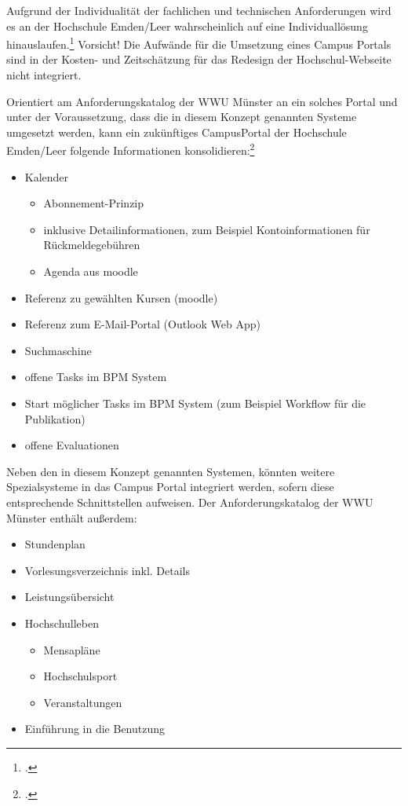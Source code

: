 Aufgrund der Individualität der fachlichen und technischen Anforderungen wird es an der Hochschule Emden/Leer wahrscheinlich auf eine Individuallösung hinauslaufen.\footcite[Vgl.][21]{dini_webportale_2007} Vorsicht! Die Aufwände für die Umsetzung eines Campus Portals sind in der Kosten- und Zeitschätzung für das Redesign der Hochschul-Webseite nicht integriert.

Orientiert am Anforderungskatalog der WWU Münster an ein solches Portal und unter der Voraussetzung, dass die in diesem Konzept genannten Systeme 
umgesetzt werden, kann ein zukünftiges CampusPortal der Hochschule Emden/Leer folgende Informationen konsolidieren:\footcite[Vgl.][158 ff.]{vogl_fortschritte_2012}

\begin{itemize}
	\item Kalender
	\begin{itemize}
		\item Abonnement-Prinzip
		\item inklusive Detailinformationen, zum Beispiel Kontoinformationen für Rückmeldegebühren
		\item Agenda aus moodle
	\end{itemize}
	\item Referenz zu gewählten Kursen (moodle)
	\item Referenz zum E-Mail-Portal (Outlook Web App)
	\item Suchmaschine
	\item offene Tasks im BPM System
	\item Start möglicher Tasks im BPM System (zum Beispiel Workflow für die Publikation)
	\item offene Evaluationen
\end{itemize}

Neben den in diesem Konzept genannten Systemen, könnten weitere Spezialsysteme in das Campus Portal integriert werden, sofern diese entsprechende Schnittstellen aufweisen. Der Anforderungskatalog der WWU Münster enthält außerdem:

\begin{itemize}
	\item Stundenplan
	\item Vorlesungsverzeichnis inkl. Details
	\item Leistungsübersicht
	\item Hochschulleben
	\begin{itemize}
		\item Mensapläne
		\item Hochschulsport
		\item Veranstaltungen
	\end{itemize}
	\item Einführung in die Benutzung
\end{itemize}

